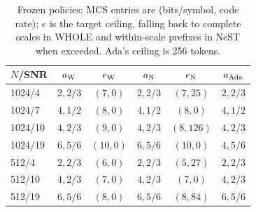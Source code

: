 \begin{table}[t]
\caption{Frozen policies: MCS entries are (bits/symbol, code rate); $e$ is the target ceiling, falling back to complete scales in WHOLE and within-scale prefixes in NeST when exceeded. Ada's ceiling is 256 tokens.}
\label{tab:policies}\centering\footnotesize\setlength{\tabcolsep}{2.5pt}
\begin{tabular}{@{}lccccc@{}}\toprule
$N$/SNR & $a_{\rm W}$ & $e_{\rm W}$ & $a_{\rm N}$ & $e_{\rm N}$ & $a_{\rm Ada}$\\\midrule
1024/4 & $2,2/3$ & $(7,0)$ & $2,2/3$ & $(7,25)$ & $2,2/3$\\
1024/7 & $4,1/2$ & $(8,0)$ & $4,1/2$ & $(8,0)$ & $4,1/2$\\
1024/10 & $4,2/3$ & $(9,0)$ & $4,2/3$ & $(8,126)$ & $4,2/3$\\
1024/19 & $6,5/6$ & $(10,0)$ & $6,5/6$ & $(10,0)$ & $4,5/6$\\
512/4 & $2,2/3$ & $(6,0)$ & $2,2/3$ & $(5,27)$ & $2,2/3$\\
512/10 & $4,2/3$ & $(7,0)$ & $4,2/3$ & $(7,0)$ & $4,2/3$\\
512/19 & $6,5/6$ & $(8,0)$ & $6,5/6$ & $(8,84)$ & $6,5/6$\\
\bottomrule\end{tabular}\end{table}
